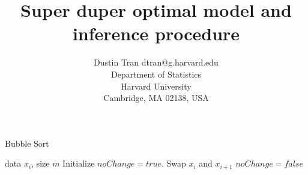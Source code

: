 \documentclass[twoside,11pt]{article}
\begin{document}
\title{Super duper optimal model and inference procedure}
\author{\name Dustin Tran \email dtran@g.harvard.edu\\
\addr Department of Statistics\\
Harvard University\\
Cambridge, MA 02138, USA
}

\editor{}

\maketitle
\begin{abstract}%
\end{abstract}

\begin{keywords}
\end{keywords}

\begin{algorithm}[tb]
  \caption{Bubble Sort}
  \label{alg:example}
\begin{algorithmic}
   data $x_i$, size $m$
  \REPEAT
  \STATE Initialize $noChange = true$.
      \STATE Swap $x_i$ and $x_{i+1}$
      \STATE $noChange = false$
    \ENDIF
  \ENDFOR
\end{algorithmic}
\end{algorithm}
\fi

\nocite{*}

\end{document}
